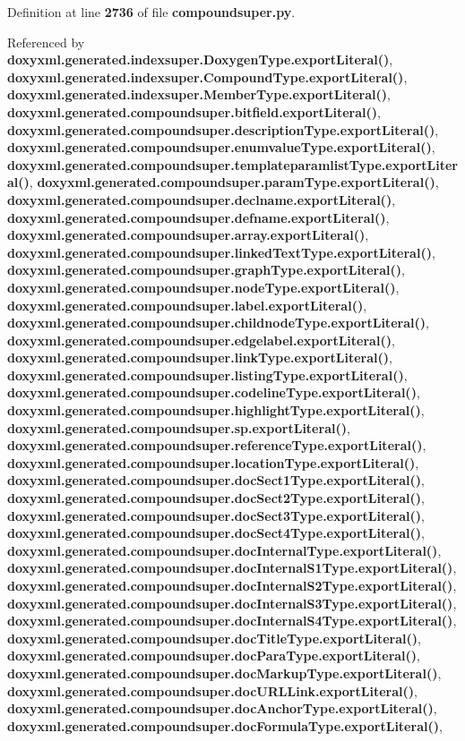Definition at line {\bf 2736} of file {\bf compoundsuper.\+py}.



Referenced by {\bf doxyxml.\+generated.\+indexsuper.\+Doxygen\+Type.\+export\+Literal()}, {\bf doxyxml.\+generated.\+indexsuper.\+Compound\+Type.\+export\+Literal()}, {\bf doxyxml.\+generated.\+indexsuper.\+Member\+Type.\+export\+Literal()}, {\bf doxyxml.\+generated.\+compoundsuper.\+bitfield.\+export\+Literal()}, {\bf doxyxml.\+generated.\+compoundsuper.\+description\+Type.\+export\+Literal()}, {\bf doxyxml.\+generated.\+compoundsuper.\+enumvalue\+Type.\+export\+Literal()}, {\bf doxyxml.\+generated.\+compoundsuper.\+templateparamlist\+Type.\+export\+Literal()}, {\bf doxyxml.\+generated.\+compoundsuper.\+param\+Type.\+export\+Literal()}, {\bf doxyxml.\+generated.\+compoundsuper.\+declname.\+export\+Literal()}, {\bf doxyxml.\+generated.\+compoundsuper.\+defname.\+export\+Literal()}, {\bf doxyxml.\+generated.\+compoundsuper.\+array.\+export\+Literal()}, {\bf doxyxml.\+generated.\+compoundsuper.\+linked\+Text\+Type.\+export\+Literal()}, {\bf doxyxml.\+generated.\+compoundsuper.\+graph\+Type.\+export\+Literal()}, {\bf doxyxml.\+generated.\+compoundsuper.\+node\+Type.\+export\+Literal()}, {\bf doxyxml.\+generated.\+compoundsuper.\+label.\+export\+Literal()}, {\bf doxyxml.\+generated.\+compoundsuper.\+childnode\+Type.\+export\+Literal()}, {\bf doxyxml.\+generated.\+compoundsuper.\+edgelabel.\+export\+Literal()}, {\bf doxyxml.\+generated.\+compoundsuper.\+link\+Type.\+export\+Literal()}, {\bf doxyxml.\+generated.\+compoundsuper.\+listing\+Type.\+export\+Literal()}, {\bf doxyxml.\+generated.\+compoundsuper.\+codeline\+Type.\+export\+Literal()}, {\bf doxyxml.\+generated.\+compoundsuper.\+highlight\+Type.\+export\+Literal()}, {\bf doxyxml.\+generated.\+compoundsuper.\+sp.\+export\+Literal()}, {\bf doxyxml.\+generated.\+compoundsuper.\+reference\+Type.\+export\+Literal()}, {\bf doxyxml.\+generated.\+compoundsuper.\+location\+Type.\+export\+Literal()}, {\bf doxyxml.\+generated.\+compoundsuper.\+doc\+Sect1\+Type.\+export\+Literal()}, {\bf doxyxml.\+generated.\+compoundsuper.\+doc\+Sect2\+Type.\+export\+Literal()}, {\bf doxyxml.\+generated.\+compoundsuper.\+doc\+Sect3\+Type.\+export\+Literal()}, {\bf doxyxml.\+generated.\+compoundsuper.\+doc\+Sect4\+Type.\+export\+Literal()}, {\bf doxyxml.\+generated.\+compoundsuper.\+doc\+Internal\+Type.\+export\+Literal()}, {\bf doxyxml.\+generated.\+compoundsuper.\+doc\+Internal\+S1\+Type.\+export\+Literal()}, {\bf doxyxml.\+generated.\+compoundsuper.\+doc\+Internal\+S2\+Type.\+export\+Literal()}, {\bf doxyxml.\+generated.\+compoundsuper.\+doc\+Internal\+S3\+Type.\+export\+Literal()}, {\bf doxyxml.\+generated.\+compoundsuper.\+doc\+Internal\+S4\+Type.\+export\+Literal()}, {\bf doxyxml.\+generated.\+compoundsuper.\+doc\+Title\+Type.\+export\+Literal()}, {\bf doxyxml.\+generated.\+compoundsuper.\+doc\+Para\+Type.\+export\+Literal()}, {\bf doxyxml.\+generated.\+compoundsuper.\+doc\+Markup\+Type.\+export\+Literal()}, {\bf doxyxml.\+generated.\+compoundsuper.\+doc\+U\+R\+L\+Link.\+export\+Literal()}, {\bf doxyxml.\+generated.\+compoundsuper.\+doc\+Anchor\+Type.\+export\+Literal()}, {\bf doxyxml.\+generated.\+compoundsuper.\+doc\+Formula\+Type.\+export\+Literal()}, 